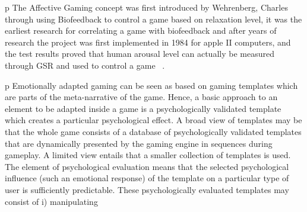 p The Affective Gaming concept was first introduced by Wehrenberg, Charles through using Biofeedback to control a game based on relaxation level, it was the earliest research for correlating a game with biofeedback and after years of research the project was first implemented in 1984 for apple II computers, and the test results proved that human arousal level can actually be measured through GSR and used to control a game ~\cite{wehrenberg1995willball}.

p Emotionally adapted gaming can be seen as based on gaming templates which are parts of the meta-narrative of the game. Hence, a basic approach to an element to be adapted inside a game is a psychologically validated template which creates a particular psychological effect. A broad view of templates may be that the whole game consists of a database of psychologically validated templates that are dynamically presented by the gaming engine in sequences during gameplay. A limited view entails that a smaller collection of templates is used. The element of psychological evaluation means that the selected psychological influence (such an emotional response) of the template on a particular type of user is sufficiently predictable. These psychologically evaluated templates may consist of i) manipulating 

